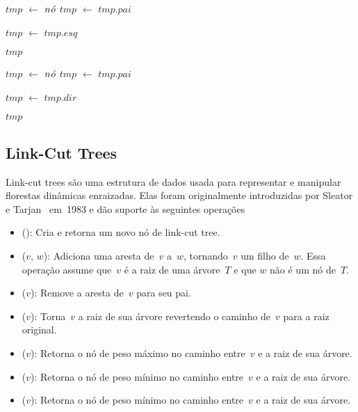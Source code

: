 \begin{algorithm}
\caption{\treapFirst($\node$)}
\label{Algo:TREAPfirst}
\begin{algorithmic}[1]
\State $tmp$ $\gets$ $\node$
  \State $tmp$ $\gets$ $tmp$.$pai$
\EndWhile

  \State $tmp$ $\gets$ $tmp$.$esq$
\EndWhile

\State\Return $tmp$
\end{algorithmic}
\end{algorithm}


\begin{algorithm}
\caption{\treapLast($\node$)}
\label{Algo:TREAPfirst}
\begin{algorithmic}[1]
\State $tmp$ $\gets$ $\node$
  \State $tmp$ $\gets$ $tmp$.$pai$
\EndWhile

  \State $tmp$ $\gets$ $tmp$.$dir$
\EndWhile

\State\Return $tmp$
\end{algorithmic}
\end{algorithm}
\subsection{Link-Cut Trees}
\label{sec:linkcuttree}
Link-cut trees são uma estrutura de dados usada para representar e manipular florestas dinâmicas enraizadas.
Elas foram originalmente introduzidas por Sleator e Tarjan~\cite{SleatroTarjanLinkCutTree1983,} em~1983 e dão suporte às seguintes operações
\begin{itemize}
\item \linkcutCreate(): Cria e retorna um novo nó de link-cut tree.
\item \linkcutAddEdge($v$, $w$): Adiciona uma aresta de~$v$ a~$w$, tornando~$v$ um filho de~$w$. Essa operação assume que~$v$ é a raiz de uma árvore~$T$ e que $w$ não é um nó de~$T$.
\item \linkcutDelEdge($v$): Remove a aresta de~$v$ para seu pai.
\item \linkcutEvert($v$): Torna~$v$ a raiz de sua árvore revertendo o caminho de~$v$ para a raiz original.
\item \linkcutMax($v$): Retorna o nó de peso máximo no caminho entre~$v$ e a raiz de sua árvore.
\item \linkcutMin($v$): Retorna o nó de peso mínimo no caminho entre~$v$ e a raiz de sua árvore.
\item \linkcutMin($v$): Retorna o nó de peso mínimo no caminho entre~$v$ e a raiz de sua árvore.
\end{itemize}


